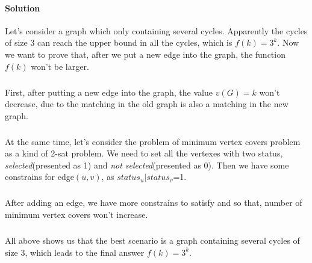 \documentclass[12pt,a4]{article}
\begin{document}
\paragraph{Solution}Let's consider a graph which only containing several cycles. Apparently the cycles of size 3 can reach the upper bound in all the cycles, which is $f(k)=3^k$. Now we want to prove that, after we put a new edge into the graph, the function $f(k)$ won't be larger.
\subparagraph{}First, after putting a new edge into the graph, the value $v(G)=k$ won't decrease, due to the matching in the old graph is also a matching in the new graph. 
\subparagraph{}At the same time, let's consider the problem of minimum vertex covers problem as a kind of 2-sat problem. We need to set all the vertexes with two status, \textsl{selected}(presented as 1) and \textsl{not selected}(presented as 0). Then we have some constrains for edge$(u,v)$, as $status_u|status_v$=1. 
\subparagraph{}After adding an edge, we have more constrains to satisfy and so that, number of minimum vertex covers won't increase.
\subparagraph{}All above shows us that the best scenario is a graph containing several cycles of size 3, which leads to the final answer $f(k)=3^k$.
\end{document}
